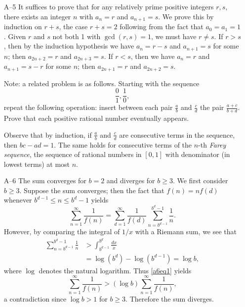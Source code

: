 \documentclass[amssymb,twocolumn,pra,10pt,aps]{revtex4-1}
\begin{document}
\begin{itemize}
\item[A--5]
It suffices to prove that for any relatively prime positive integers
$r,s$, there exists an integer $n$ with $a_n = r$ and $a_{n+1} = s$.
We prove this by induction on $r+s$, the case $r+s=2$ following
from the fact that $a_0=a_1 = 1$. Given $r$ and $s$ not both 1 with
$\gcd(r,s) = 1$, we must have $r \neq s$. If $r>s$, then by
the induction hypothesis we have $a_n = r-s$ and $a_{n+1} = s$ for
some $n$; then $a_{2n+2} = r$ and $a_{2n+3} = s$. If $r< s$,
then we have $a_n = r$ and $a_{n+1} = s-r$ for some $n$; then
$a_{2n+1} = r$ and $a_{2n+2} = s$.

Note: a related problem is as follows. Starting with the sequence
\[
\frac{0}{1}, \frac{1}{0},
\]
repeat the following operation: insert between each pair
$\frac{a}{b}$ and $\frac{c}{d}$ the pair $\frac{a+c}{b+d}$.
Prove that each positive rational number eventually appears.

Observe that by induction, if $\frac{a}{b}$ and $\frac{c}{d}$
are consecutive terms in the sequence, then $bc - ad = 1$. The
same holds for consecutive terms of the $n$-th \emph{Farey sequence}, the
sequence of rational numbers in $[0,1]$ with denominator
(in lowest terms) at most $n$.

\item[A--6]
The sum converges for $b=2$ and diverges for $b \geq 3$.
We first consider $b \geq 3$. Suppose the sum converges;
then the fact
that $f(n) = n f(d)$ whenever $b^{d-1} \leq n \leq b^{d} - 1$ yields
\begin{equation} \label{a6eq1}
\sum_{n=1}^\infty \frac{1}{f(n)}
= \sum_{d=1}^\infty \frac{1}{f(d)} \sum_{n=b^{d-1}}^{b^d - 1} \frac{1}{n}.
\end{equation}
However, by comparing the integral of $1/x$ with a Riemann sum,
we see that
\begin{align*}
\sum_{n=b^{d-1}}^{b^d - 1} \frac{1}{n}
&> \int_{b^{d-1}}^{b^d} \frac{dx}{x} \\
&= \log (b^d) - \log (b^{d-1}) = \log b,
\end{align*}
where $\log$ denotes the natural logarithm. Thus \eqref{a6eq1} yields
\[
\sum_{n=1}^\infty \frac{1}{f(n)}
> (\log b) \sum_{n=1}^\infty \frac{1}{f(n)},
\]
a contradiction since $\log b > 1$ for $b \geq 3$. Therefore the
sum diverges.


\end{itemize}
\end{document}
